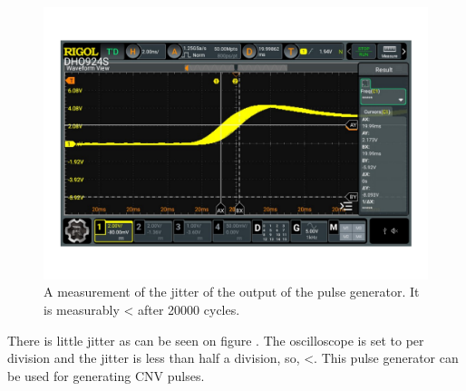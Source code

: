 \begin{figure}[H]
    \centering
    \includegraphics[clip, trim=0 50 0 50, width=1\textwidth]{Appendix/Figures/A_PulseWidth_Gen_JitterB.pdf}
    \caption{A measurement of the jitter of the output of the pulse generator. It is measurably < after 20000 cycles.}
    \label{fig:A_PulseGenWidth_JitterTestB}
\end{figure}

There is little jitter as can be seen on figure . The oscilloscope is set to  per division and the jitter is less than half a division, so, <. This pulse generator can be used for generating CNV pulses.
